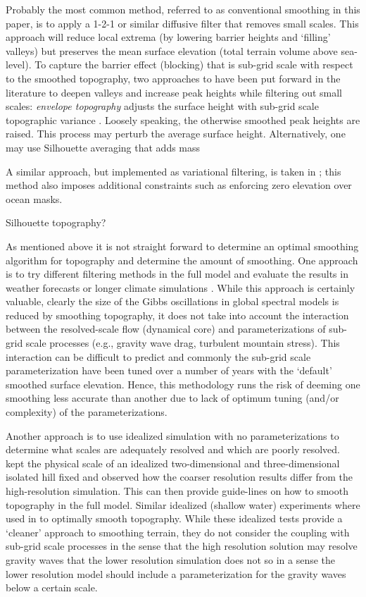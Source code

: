 \documentclass[gmd]{copernicus}
\begin{document}
Probably the most common method, referred to as conventional smoothing in this paper, is to apply a 1-2-1 or similar diffusive filter that removes small scales. This approach will reduce local extrema (by lowering barrier heights and `filling' valleys) but preserves the mean surface elevation (total terrain volume above sea-level). To capture the barrier effect (blocking) that is sub-grid scale with respect to the smoothed topography, two approaches to have been put forward in the literature to deepen valleys and increase peak heights while filtering out small scales: {\em{envelope topography}} adjusts the surface height with sub-grid scale topographic variance \citep{WTS1983QJRMS,MS1982JMSJ}. Loosely speaking, the otherwise smoothed peak heights are raised. This process may perturb the average surface height. Alternatively, one may use Silhouette averaging that adds mass 

A similar approach, but implemented as variational filtering, is taken in \cite{RTS2006QJRMS}; this method also imposes additional constraints such as enforcing zero elevation over ocean masks.

\cite{SSM2005WRF,WT2004RAMS} Silhouette topography? \cite{B1990CSU}

As mentioned above it is not straight forward to determine an optimal smoothing algorithm for topography and determine the amount of smoothing. One approach is to try different filtering methods in the full model and evaluate the results in weather forecasts or longer climate simulations \citep{NSM1994JC,B1995QJRMS,H1996JC}. While this approach is certainly valuable, clearly the size of the Gibbs oscillations in global spectral models is reduced by smoothing topography, it does not take into account the interaction between the resolved-scale flow (dynamical core) and parameterizations of sub-grid scale processes (e.g., gravity wave drag, turbulent mountain stress). This interaction can be difficult to predict and commonly the sub-grid scale parameterization have been tuned over a number of years with the `default' smoothed surface elevation. Hence, this methodology runs the risk of deeming one smoothing less accurate than another due to lack of optimum tuning (and/or complexity) of the parameterizations.

Another approach is to use idealized simulation with no parameterizations to determine what scales are adequately resolved and which are poorly resolved. \cite{DB2001QJRMS} kept the physical scale of an idealized two-dimensional and three-dimensional isolated hill fixed and observed how the coarser resolution results differ from the high-resolution simulation. This can then provide guide-lines on how to smooth topography in the full model. Similar idealized (shallow water) experiments where used in \cite{RTS2006QJRMS} to optimally smooth topography. While these idealized tests provide a `cleaner' approach to smoothing terrain, they do not consider the coupling with sub-grid scale processes in the sense that the high resolution solution may resolve gravity waves that the lower resolution simulation does not so in a sense the lower resolution model should include a parameterization for the gravity waves below a certain scale.
%
\end{document}
